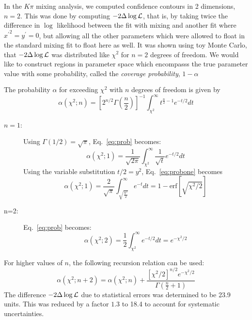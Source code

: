 \documentclass[11pt]{article}
\def\chisq       {\ensuremath{\chi^2}\xspace}
\def\xprimesq    {\ensuremath{{x^{\prime}}^2}\xspace}
\def\yprime      {\ensuremath{y^{\prime}}\xspace}
\begin{document}
In the $K\pi$ mixing analysis, we computed confidence contours in 2 dimensions, $n=2$. This was done by computing $-2\Delta\log{\cal L}$, that is, by taking twice the difference in 
$\log$ likelihood between the fit with mixing and another fit where $\xprimesq = \yprime = 0$, but allowing all the other parameters which were allowed to float in  
the standard mixing fit to float here as well. 
It was shown using toy Monte Carlo, that $-2\Delta\log{\cal L}$ was 
distributed like $\chisq$ for $n=2$ degrees of freedom. We would like to construct
regions in parameter space which encompasss the true parameter value with
some probability, called the {\it coverage probability}, $1-\alpha$
\par
The probability $\alpha$ for exceeding \chisq with $n$ degrees of freedom is given by
\begin{equation}
\alpha(\chisq;n) = \left[2^{n/2}\Gamma\left(\frac{n}{2}\right)\right]^{-1}\int_{\chisq}^{\infty}t^{\frac{n}{2}-1}e^{-t/2}dt\label{eq:prob}
\end{equation}
\begin{description}
\item[$n=1$:]
Using $\Gamma(1/2)=\sqrt{\pi}$, Eq.~\ref{eq:prob} becomes:
\begin{equation}
\alpha(\chisq;1) = \frac{1}{\sqrt{2\pi}} \int_{\chisq}^{\infty}
\frac{1}{\sqrt{t}}e^{-t/2}dt\label{eq:probone}
\end{equation}
Using the variable substitution $t/2 = y^2$, Eq.~\ref{eq:probone} becomes
\begin{equation}
\alpha(\chisq;1) = \frac{2}{\sqrt{\pi}}\int_{\sqrt{\frac{\chisq}{2}}}^{\infty}e^{-t}dt=1-\mathrm{erf}\left[\sqrt{\chisq/2}\right]\label{eq:probonep}
\end{equation}
\item[n=2:] Eq.~\ref{eq:prob} becomes:
\begin{equation}
\alpha(\chisq;2) = \frac{1}{2}\int_{\chisq}^{\infty}e^{-t/2}dt=e^{-\chisq/2}\label{eq:probtwo}
\end{equation} 
\end{description}
For higher values of $n$, the following recursion relation can be used:
\begin{equation} 
\alpha(\chisq;n+2) = \alpha(\chisq;n) +\frac{\left[\chisq/2\right]^{n/2}e^{-\chisq/2}}{\Gamma\left(\frac{n}{2}+1\right)}\label{eq:probn} 
\end{equation} 
The difference $-2\Delta\log{\cal L}$ due to statistical errors was determined to be 23.9 units. This was reduced by a factor $1.3$ to 18.4 to account for systematic uncertainties.
\end{document}
